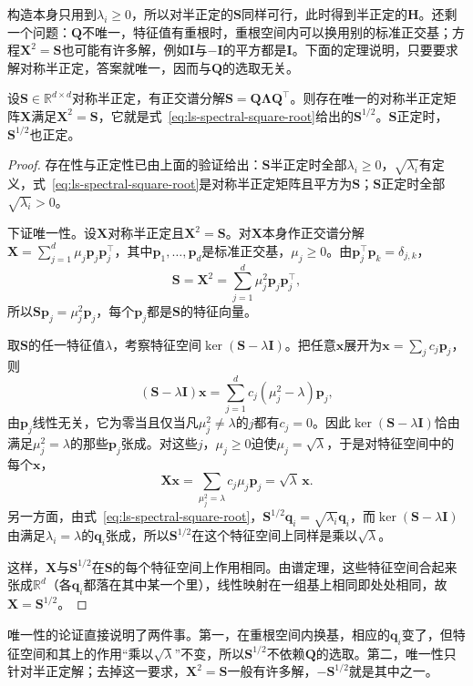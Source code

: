 构造本身只用到$\lambda_i\geq0$，所以对半正定的$\bm S$同样可行，此时得到半正定的$\bm H$。还剩一个问题：$\bm Q$不唯一，特征值有重根时，重根空间内可以换用别的标准正交基；方程$\bm X^2=\bm S$也可能有许多解，例如$\bm I$与$-\bm I$的平方都是$\bm I$。下面的定理说明，只要要求解对称半正定，答案就唯一，因而与$\bm Q$的选取无关。

\begin{theorem}[半正定平方根的存在与唯一]
\label{thm:ls-psd-square-root}
设$\bm S\in\mathbb R^{d\times d}$对称半正定，有正交谱分解$\bm S=\bm Q\bm\Lambda\bm Q^\top$。则存在唯一的对称半正定矩阵$\bm X$满足$\bm X^2=\bm S$，它就是式~\eqref{eq:ls-spectral-square-root}给出的$\bm S^{1/2}$。$\bm S$正定时，$\bm S^{1/2}$也正定。
\end{theorem}
\begin{proof}
存在性与正定性已由上面的验证给出：$\bm S$半正定时全部$\lambda_i\geq0$，$\sqrt{\lambda_i}$有定义，式~\eqref{eq:ls-spectral-square-root}是对称半正定矩阵且平方为$\bm S$；$\bm S$正定时全部$\sqrt{\lambda_i}>0$。

下证唯一性。设$\bm X$对称半正定且$\bm X^2=\bm S$。对$\bm X$本身作正交谱分解$\bm X=\sum_{j=1}^d\mu_j\bm p_j\bm p_j^\top$，其中$\bm p_1,\ldots,\bm p_d$是标准正交基，$\mu_j\geq0$。由$\bm p_j^\top\bm p_k=\delta_{j,k}$，
\[
 \bm S=\bm X^2=\sum_{j=1}^d\mu_j^2\bm p_j\bm p_j^\top ,
\]
所以$\bm S\bm p_j=\mu_j^2\bm p_j$，每个$\bm p_j$都是$\bm S$的特征向量。

取$\bm S$的任一特征值$\lambda$，考察特征空间$\ker(\bm S-\lambda\bm I)$。把任意$\bm x$展开为$\bm x=\sum_jc_j\bm p_j$，则
\[
 (\bm S-\lambda\bm I)\bm x=\sum_{j=1}^dc_j(\mu_j^2-\lambda)\bm p_j ,
\]
由$\bm p_j$线性无关，它为零当且仅当凡$\mu_j^2\neq\lambda$的$j$都有$c_j=0$。因此$\ker(\bm S-\lambda\bm I)$恰由满足$\mu_j^2=\lambda$的那些$\bm p_j$张成。对这些$j$，$\mu_j\geq0$迫使$\mu_j=\sqrt\lambda$，于是对特征空间中的每个$\bm x$，
\[
 \bm X\bm x=\sum_{\mu_j^2=\lambda}c_j\mu_j\bm p_j=\sqrt\lambda\,\bm x .
\]
另一方面，由式~\eqref{eq:ls-spectral-square-root}，$\bm S^{1/2}\bm q_i=\sqrt{\lambda_i}\bm q_i$，而$\ker(\bm S-\lambda\bm I)$由满足$\lambda_i=\lambda$的$\bm q_i$张成，所以$\bm S^{1/2}$在这个特征空间上同样是乘以$\sqrt\lambda$。

这样，$\bm X$与$\bm S^{1/2}$在$\bm S$的每个特征空间上作用相同。由谱定理，这些特征空间合起来张成$\mathbb R^d$（各$\bm q_i$都落在其中某一个里），线性映射在一组基上相同即处处相同，故$\bm X=\bm S^{1/2}$。
\end{proof}

唯一性的论证直接说明了两件事。第一，在重根空间内换基，相应的$\bm q_i$变了，但特征空间和其上的作用“乘以$\sqrt\lambda$”不变，所以$\bm S^{1/2}$不依赖$\bm Q$的选取。第二，唯一性只针对半正定解；去掉这一要求，$\bm X^2=\bm S$一般有许多解，$-\bm S^{1/2}$就是其中之一。

